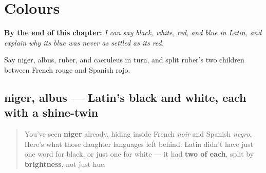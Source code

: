 
\chapter{Colours}
\label{ch:la-colours}

\begin{chapteropening}
\textbf{By the end of this chapter:} \emph{I can say black, white, red, and blue in Latin, and explain why its blue was never as settled as its red.}

Say niger, albus, ruber, and caeruleus in turn, and split ruber's two children between French rouge and Spanish rojo.
\end{chapteropening}

\section[niger, albus]{niger, albus — Latin's black and white, each with a shine-twin}

\label{lesson:LA-C06-niger-albus}



\begin{quote}
You've seen \textbf{niger} already, hiding inside French \emph{noir} and Spanish \emph{negro}. Here's what those daughter languages left behind: Latin didn't have just one word for black, or just one for white — it had \textbf{two of each}, split by \textbf{brightness}, not just hue.
\end{quote}

